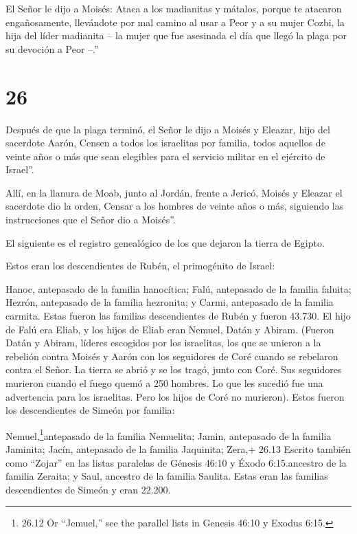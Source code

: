  El Señor le dijo a Moisés:  Ataca a los
madianitas y mátalos,  porque te atacaron engañosamente,
llevándote por mal camino al usar a Peor y a su mujer Cozbi, la hija del
líder madianita -- la mujer que fue asesinada el día que llegó la plaga
por su devoción a Peor --.''

\hypertarget{section-25}{%
\section{26}\label{section-25}}

 Después de que la plaga terminó, el Señor le dijo a Moisés
y Eleazar, hijo del sacerdote Aarón,  Censen a todos los
israelitas por familia, todos aquellos de veinte años o más que sean
elegibles para el servicio militar en el ejército de Israel''.

 Allí, en la llanura de Moab, junto al Jordán, frente a
Jericó, Moisés y Eleazar el sacerdote dio la orden,  Censar
a los hombres de veinte años o más, siguiendo las instrucciones que el
Señor dio a Moisés''.

El siguiente es el registro genealógico de los que dejaron la tierra de
Egipto.

 Estos eran los descendientes de Rubén, el primogénito de
Israel:

Hanoc, antepasado de la familia hanocítica; Falú, antepasado de la
familia faluita;  Hezrón, antepasado de la familia
hezronita; y Carmi, antepasado de la familia carmita.  Estas
fueron las familias descendientes de Rubén y fueron 43.730. 
El hijo de Falú era Eliab,  y los hijos de Eliab eran
Nemuel, Datán y Abiram. (Fueron Datán y Abiram, líderes escogidos por
los israelitas, los que se unieron a la rebelión contra Moisés y Aarón
con los seguidores de Coré cuando se rebelaron contra el Señor.
 La tierra se abrió y se los tragó, junto con Coré. Sus
seguidores murieron cuando el fuego quemó a 250 hombres. Lo que les
sucedió fue una advertencia para los israelitas.  Pero los
hijos de Coré no murieron).  Estos fueron los descendientes
de Simeón por familia:

Nemuel,\footnote{26.12 Or ``Jemuel,'' see the parallel lists in Genesis
  46:10 y Exodus 6:15.}antepasado de la familia Nemuelita; Jamin,
antepasado de la familia Jaminita; Jacín, antepasado de la familia
Jaquinita;  Zera,+ 26.13 Escrito también como ``Zojar'' en
las listas paralelas de Génesis 46:10 y Éxodo 6:15.ancestro de la
familia Zeraita; y Saul, ancestro de la familia Saulita. 
Estas eran las familias descendientes de Simeón y eran 22.200.

